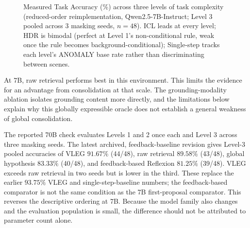 \documentclass[onecolumn]{IEEEtran}
\numberwithin{equation}{section}
\theoremstyle{definition}
\theoremstyle{remark}
\begin{document}
\begin{figure}[htbp]
    \centering
    \caption{Measured Task Accuracy (\%) across three levels of task complexity (reduced-order reimplementation, Qwen2.5-7B-Instruct; Level 3 pooled across 3 masking seeds, $n=48$). ICL leads at every level; HDR is bimodal (perfect at Level 1's non-conditional rule, weak once the rule becomes background-conditional); Single-step tracks each level's ANOMALY base rate rather than discriminating between scenes.}
    \label{fig:exp1_results}
\end{figure}

At 7B, raw retrieval performs best in this environment. This limits the evidence for an advantage from consolidation at that scale. The grounding-modality ablation isolates grounding content more directly, and the limitations below explain why this globally expressible oracle does not establish a general weakness of global consolidation.

The reported 70B check evaluates Levels 1 and 2 once each and Level 3 across three masking seeds. The latest archived, feedback-baseline revision gives Level-3 pooled accuracies of VLEG $91.67\%$ (44/48), raw retrieval $89.58\%$ (43/48), global hypothesis $83.33\%$ (40/48), and feedback-based Reflexion $81.25\%$ (39/48). VLEG exceeds raw retrieval in two seeds but is lower in the third. These replace the earlier $93.75\%$ VLEG and single-step-baseline numbers; the feedback-based comparator is not the same condition as the 7B first-proposal comparator. This reverses the descriptive ordering at 7B. Because the model family also changes and the evaluation population is small, the difference should not be attributed to parameter count alone.
\end{document}
